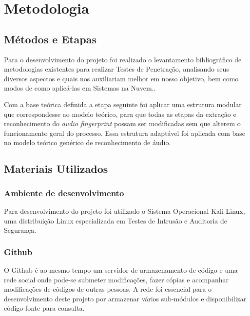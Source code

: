 \chapter{Metodologia}
\label{c.metodologia}

\section{Métodos e Etapas}
\label{s.metodoseetapas}

Para o desenvolvimento do projeto foi realizado o levantamento bibliográfico de metodologias existentes para realizar Testes de Penetração, analisando seus diversos aspectos e quais nos auxiliariam melhor em nosso objetivo, bem como modos de como aplicá-las em Sistemas na Nuvem..

Com a base teórica definida a etapa seguinte foi aplicar uma estrutura modular que correspondesse ao modelo teórico, para que todas as etapas da extração e reconhecimento do \emph{audio fingerprint} possam ser modificadas sem que alterem o funcionamento geral do processo. Essa estrutura adaptável foi aplicada com base no modelo teórico genérico de reconhecimento de áudio.


\section{Materiais Utilizados}
\label{s.materiaisutilizados}

\subsection{Ambiente de desenvolvimento}
\label{s.kali}

Para desenvolvimento do projeto foi utilizado o Sistema Operacional Kali Linux, uma distribuição Linux especializada em Testes de Intrusão e Auditoria de Segurança.

\subsection{Github}
\label{s.github}

O Github é ao mesmo tempo um servidor de armazenamento de código e uma rede social onde pode-se submeter modificações, fazer cópias e acompanhar modificações de códigos de outras pessoas. A rede foi essencial para o desenvolvimento deste projeto por armazenar vários sub-módulos e disponibilizar código-fonte para consulta.
